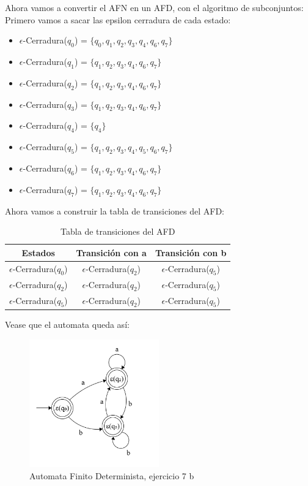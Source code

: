 \begin{enumerate}
    Ahora vamos a convertir el AFN en un AFD, con el algoritmo de subconjuntos:
    Primero vamos a sacar las epsilon cerradura de cada estado:
    \begin{itemize}
        \item $\epsilon$-Cerradura($q_0$) = $\{q_0, q_1, q_2, q_3, q_4, q_6, q_7\}$
        \item $\epsilon$-Cerradura($q_1$) = $\{q_1, q_2, q_3, q_4, q_6, q_7\}$
        \item $\epsilon$-Cerradura($q_2$) = $\{q_1, q_2, q_3, q_4, q_6, q_7\}$
        \item $\epsilon$-Cerradura($q_3$) = $\{q_1, q_2, q_3, q_4, q_6, q_7\}$
        \item $\epsilon$-Cerradura($q_4$) = $\{q_4\}$
        \item $\epsilon$-Cerradura($q_5$) = $\{q_1, q_2, q_3, q_4, q_5, q_6, q_7\}$
        \item $\epsilon$-Cerradura($q_6$) = $\{q_1, q_2, q_3, q_4, q_6, q_7\}$
        \item $\epsilon$-Cerradura($q_7$) = $\{q_1, q_2, q_3, q_4, q_6, q_7\}$
    \end{itemize}
    Ahora vamos a construir la tabla de transiciones del AFD:
    \begin{table}[h!]        
    \centering
    \begin{tabular}{|c|c|c|}
    \hline
    \textbf{Estados} & \textbf{Transición con a} & \textbf{Transición con b } \\
    \hline
    $\epsilon$-Cerradura($q_0$) &$\epsilon$-Cerradura($q_2$) & $\epsilon$-Cerradura($q_5$) \\
    \hline      
    $\epsilon$-Cerradura($q_2$) & $\epsilon$-Cerradura($q_2$) & $\epsilon$-Cerradura($q_5$) \\
    \hline 
    $\epsilon$-Cerradura($q_5$) & $\epsilon$-Cerradura($q_2$) & $\epsilon$-Cerradura($q_5$)\\
    \hline
    \end{tabular}
    \caption{Tabla de transiciones del AFD} 
    \end{table}

    Vease que el automata queda así: \\

    \begin{figure}[h!]
        \centering
        \includegraphics[width=0.5\textwidth]{images/Captura de pantalla 2025-09-14 230833.png}
        \caption{Automata Finito Determinista, ejercicio 7 b}
    \end{figure}
    \newpage


\end{enumerate}
